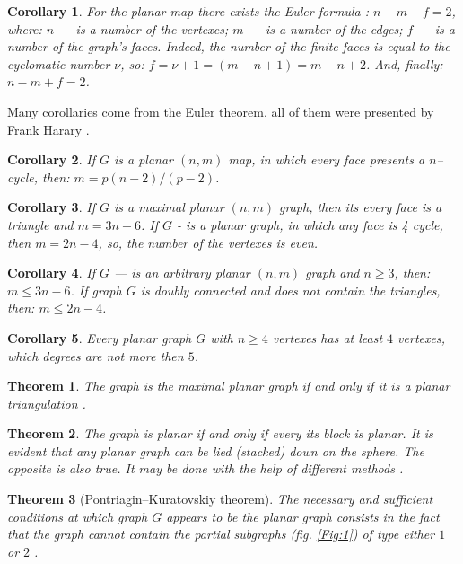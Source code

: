 \documentclass{amsart}
\newtheorem{theorem}{Theorem}
\theoremstyle{plain}
\newtheorem{corollary}{Corollary}
\numberwithin{equation}{section}
\begin{document}
\begin {corollary}
For the planar map there exists the Euler formula \cite{Euler}:  $n-m+f=2$, where: $n$ --- is a number of the vertexes; $m$ --- is a number of the edges; $f$ --- is a number of the graph's faces. Indeed, the number of the finite faces is equal to the cyclomatic number $\nu$, so: $f=\nu+1=(m-n+1)=m-n+2$. 
And, finally: $n-m+f=2$. 
\end{corollary}

Many corollaries come from the Euler theorem, all of them were presented by Frank Harary \cite {Harary}.

\begin {corollary}
If $G$ is a planar $(n,m)$ map, in which every face presents a $n$--cycle, then: $m=p(n-2)/(p-2)$.
\end {corollary}

\begin {corollary}
If $G$ is a maximal planar $(n,m)$ graph, then its every face is a triangle and $m=3n-6$. If $G$ - is a planar graph, in which any face is 4 cycle, then $m=2n-4$, so, the number of the vertexes is even.
\end {corollary}

\begin {corollary}
If $G$ --- is an arbitrary planar $(n,m)$ graph and $n \ge 3$, then: $m \le 3n-6$. If graph $G$ is doubly connected and does not contain the triangles, then: $m \le 2n-4$.
\end {corollary}

\begin {corollary}
Every planar graph $G$ with $n \ge 4$ vertexes has at least $4$ vertexes, which degrees are not more then $5$.
\end {corollary}

\begin {theorem}
The graph is the maximal planar graph if and only if it is a planar triangulation \cite {Harary}.
\end {theorem}

\begin {theorem}
The graph is planar if and only if every its block is planar. It is evident that any planar graph can be lied (stacked) down on the sphere. The opposite is also true. It may be done with the help of different methods \cite {Harary}.
\end {theorem}

\begin {theorem}[Pontriagin--Kuratovskiy theorem] 
The necessary and sufficient conditions at which graph $G$ appears to be the planar graph consists in the fact that the graph cannot contain the partial subgraphs (fig. \ref {Fig:1}) of type either $1$ or $2$ \cite {Berge}.
\end {theorem}
\end{document}
